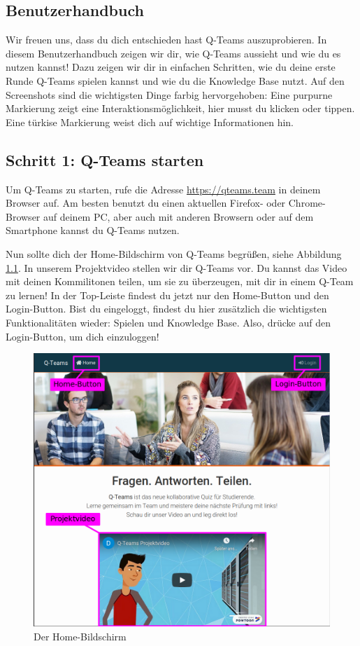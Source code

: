 \documentclass[a4paper,11pt,listof=numbered,glossary=totoc,parskip=half,toc=bib]{scrreprt}
\begin{document}
\begin{appendices}
	\chapter{Benutzerhandbuch}

	Wir freuen uns, dass du dich entschieden hast Q-Teams auszuprobieren. In diesem Benutzerhandbuch zeigen wir dir, wie Q-Teams aussieht und wie du es nutzen kannst! Dazu zeigen wir dir in einfachen Schritten, wie du deine erste Runde Q-Teams spielen kannst und wie du die Knowledge Base nutzt. Auf den Screenshots sind die wichtigsten Dinge farbig hervorgehoben: Eine purpurne Markierung zeigt eine Interaktionsmöglichkeit, hier musst du klicken oder tippen. Eine türkise Markierung weist dich auf wichtige Informationen hin.
	\newpage
	\section*{Schritt 1: Q-Teams starten}
	
	Um Q-Teams zu starten, rufe die Adresse \url{https://qteams.team} in deinem Browser auf. Am besten benutzt du einen aktuellen Firefox- oder Chrome-Browser auf deinem PC, aber auch mit anderen Browsern oder auf dem Smartphone kannst du Q-Teams nutzen.
	
	Nun sollte dich der Home-Bildschirm von Q-Teams begrüßen, siehe Abbildung \ref{fig:guide_home}. In unserem Projektvideo stellen wir dir Q-Teams vor. Du kannst das Video mit deinen Kommilitonen teilen, um sie zu überzeugen, mit dir in einem Q-Team zu lernen! In der Top-Leiste findest du jetzt nur den Home-Button und den Login-Button. Bist du eingeloggt, findest du hier zusätzlich die wichtigsten Funktionalitäten wieder: Spielen und Knowledge Base. Also, drücke auf den Login-Button, um dich einzuloggen!
	
	\begin{figure}[h!]
		\centering
		\includegraphics[width=\textwidth]{UserGuide/Home.png}
		\caption{Der Home-Bildschirm}
		\label{fig:guide_home}
	\end{figure}
	\newpage

\end{appendices}
\end{document}
